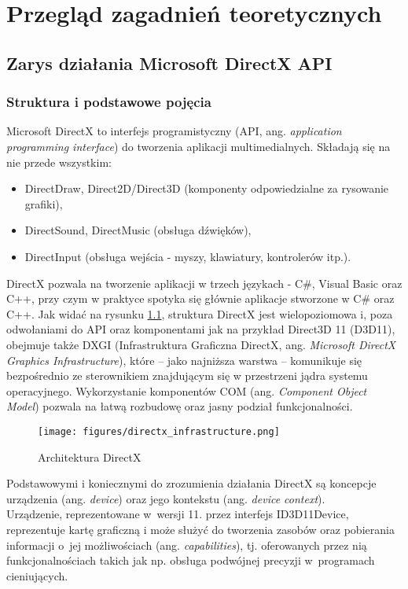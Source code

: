 
\chapter{Przegląd zagadnień teoretycznych}

\section{Zarys działania Microsoft DirectX API}

\subsection{Struktura i podstawowe pojęcia}

Microsoft DirectX to interfejs programistyczny (API, ang. \emph{application programming interface}) do tworzenia aplikacji multimedialnych. Składają się na nie przede wszystkim:

\begin{itemize}
\item DirectDraw, Direct2D/Direct3D (komponenty odpowiedzialne za rysowanie grafiki),
\item DirectSound, DirectMusic (obsługa dźwięków),
\item DirectInput (obsługa wejścia - myszy, klawiatury, kontrolerów itp.).
\end{itemize}

DirectX pozwala na tworzenie aplikacji w trzech językach - C\#, Visual Basic oraz C++, przy czym w praktyce spotyka się głównie aplikacje stworzone w C\# oraz C++.
Jak widać na rysunku \ref{directx_infrastructure}, struktura DirectX jest wielopoziomowa i, poza odwołaniami do API oraz komponentami jak na przykład Direct3D 11 (D3D11), obejmuje także DXGI (Infrastruktura Graficzna DirectX, ang. \emph{Microsoft DirectX Graphics Infrastructure}), które -- jako najniższa warstwa -- komunikuje się bezpośrednio ze sterownikiem znajdującym się w przestrzeni jądra systemu operacyjnego. Wykorzystanie komponentów COM (ang. \emph{Component Object Model}) pozwala na łatwą rozbudowę oraz jasny podział funkcjonalności.\\
\begin{figure}
\begin{center}
\texttt{[image: figures/directx\_infrastructure.png]}
\caption{Architektura DirectX}
\label{directx_infrastructure}
\end{center}
\end{figure}

Podstawowymi i koniecznymi do zrozumienia działania DirectX są koncepcje urządzenia (ang. \emph{device}) oraz jego kontekstu (ang. \emph{device context}).\\
Urządzenie, reprezentowane w~wersji 11. przez interfejs ID3D11Device, reprezentuje kartę graficzną i może służyć do tworzenia zasobów oraz pobierania informacji o~jej możliwościach (ang. \emph{capabilities}), tj. oferowanych przez nią funkcjonalnościach takich jak np. obsługa podwójnej precyzji w~programach cieniujących.

